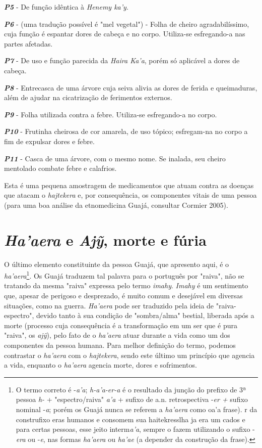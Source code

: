 \emph{\textbf{P5}} - De função idêntica à \emph{Henemy ka'y}.

\emph{\textbf{P6}} - (uma tradução possível é "mel vegetal") - Folha de
cheiro agradabilíssimo, cuja função é espantar dores de cabeça e no
corpo. Utiliza-se esfregando-a nas partes afetadas.

\emph{\textbf{P7}} - De uso e função parecida da \emph{Haira Ka'a},
porém só aplicável a dores de cabeça.

\emph{\textbf{P8}} - Entrecasca de uma árvore cuja seiva alivia as dores
de ferida e queimaduras, além de ajudar na cicatrização de ferimentos
externos.

\emph{\textbf{P9}} - Folha utilizada contra a febre. Utiliza-se
esfregando-a no corpo.

\emph{\textbf{P10}} - Frutinha cheirosa de cor amarela, de uso tópico;
esfregam-na no corpo a fim de expulsar dores e febre.

\emph{\textbf{P11}} - Casca de uma árvore, com o mesmo nome. Se inalada,
seu cheiro mentolado combate febre e calafrios.

Esta é uma pequena amostragem de medicamentos que atuam contra as
doenças que atacam o \emph{hajtekera} e, por consequência, os
componentes vitais de uma pessoa (para uma boa análise da etnomedicina
Guajá, consultar Cormier 2005).

\section{\emph{Ha'aera} e \emph{Ajỹ}, morte e
fúria}\label{haaera-e-ajy-morte-e-fuxfaria}

O último elemento constituinte da pessoa Guajá, que apresento aqui, é o
\emph{ha'aera}\footnote{O termo correto é -\emph{a'a}; \emph{h-a'a-er-a}
  é o resultado da junção do prefixo de 3ª pessoa \emph{h-} +
  "espectro/raiva" \emph{a'a} + sufixo de a.n. retrospectiva -\emph{er
  +} sufixo nominal -\emph{a}; porém os Guajá nunca se referem a
  \emph{ha'aera} como oa'a frase). r da construfixo eras humanos e
  consomem sua haitekresslha ja era um cados e para certas pessoas, esse
  jeito interm\emph{a'a}, sempre o fazem utilizando o sufixo -\emph{era}
  ou -\emph{e}, nas formas \emph{ha'aera} ou \emph{ha'ae} (a depender da
  construção da frase).}. Os Guajá traduzem tal palavra para o português
por "raiva", não se tratando da mesma "raiva" expressa pelo termo
\emph{imahy}. \emph{Imahy} é um sentimento que, apesar de perigoso e
desprezado, é muito comum e desejável em diversas situações, como na
guerra. \emph{Ha'aera} pode ser traduzido pela ideia de
"raiva-espectro", devido tanto à sua condição de "sombra/alma" bestial,
liberada após a morte (processo cuja consequência é a transformação em
um ser que é pura "raiva", os \emph{ajỹ}), pelo fato de o \emph{ha'aera}
atuar durante a vida como um dos componentes da pessoa humana. Para
melhor definição do termo, podemos contrastar o \emph{ha'aera} com o
\emph{hajtekera}, sendo este último um princípio que agencia a vida,
enquanto o \emph{ha'aera} agencia morte, dores e sofrimentos.

